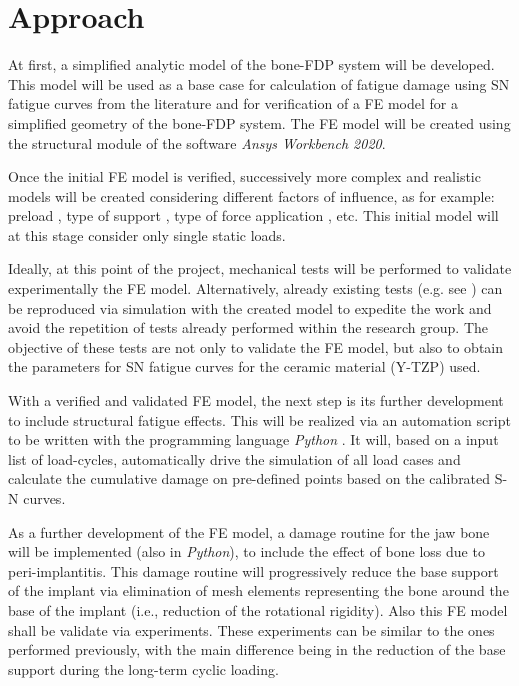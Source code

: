 \section{Approach}
\label{sec:approach}

At first, a simplified analytic model of the bone-\ac{FDP} system will be developed. This model will be used as a base case for calculation of fatigue damage using \ac{SN} fatigue curves from the literature and for verification of a \ac{FE} model for a simplified geometry of the bone-\ac{FDP} system. The \ac{FE} model will be created using the structural module of the software \emph{Ansys Workbench 2020}.

Once the initial FE model is verified, successively more complex and realistic models will be created considering different factors of influence, as for example: preload \citep{joern2016}, type of support  \citep{rand2016}, type of force application \citep{rand2017}, etc. This initial model will at this stage consider only single static loads.

Ideally, at this point of the project, mechanical tests will be performed to validate experimentally the \ac{FE} model. Alternatively, already existing tests (e.g. see \citep{kohorst2007, herzog2009, schneemann2006}) can be reproduced via simulation with the created model to expedite the work and avoid the repetition of tests already performed within the research group. 
The objective of these tests are not only to validate the \ac{FE} model, but also to obtain the parameters for \ac{SN} fatigue curves for the ceramic material (\ac{Y-TZP}) used.

With a verified and validated FE model, the next step is its further development to include structural fatigue effects. This will be realized via an automation script to be written with the programming language \emph{Python} \citep{python2009}. It will, based on a input list of load-cycles, automatically drive the simulation of all load cases and calculate the cumulative damage on pre-defined points based on the calibrated S-N curves.

As a further development of the \ac{FE} model, a damage routine for the jaw bone will be implemented (also in \emph{Python}), to include the effect of bone loss due to peri-implantitis.
This damage routine will progressively reduce the base support of the implant via elimination of mesh elements representing the bone around the base of the implant (i.e., reduction of the rotational rigidity).
Also this \ac{FE} model shall be validate via experiments.
These experiments can be similar to the ones performed previously, with the main difference being in the reduction of the base support during the long-term cyclic loading.
